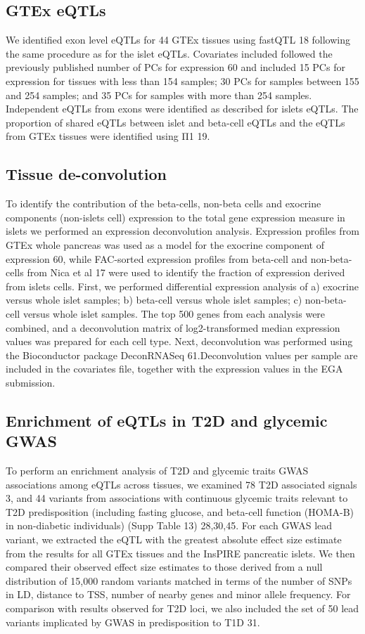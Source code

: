 \subsection{GTEx eQTLs}
We identified exon level eQTLs for 44 GTEx tissues using fastQTL 18 following the same procedure as for the islet eQTLs. Covariates included followed the previously published number of PCs for expression 60 and included 15 PCs for expression for tissues with less than 154 samples; 30 PCs for samples between 155 and 254 samples; and 35 PCs for samples with more than 254 samples. Independent eQTLs from exons were identified as described for islets eQTLs. The proportion of shared eQTLs between islet and beta-cell eQTLs and the eQTLs from GTEx tissues were identified using Π1 19.

\subsection{Tissue de-convolution}
To identify the contribution of the beta-cells, non-beta cells and exocrine components (non-islets cell) expression to the total gene expression measure in islets we performed an expression deconvolution analysis. Expression profiles from GTEx whole pancreas was used as a model for the exocrine component of expression 60, while FAC-sorted expression profiles from beta-cell and non-beta-cells from Nica et al 17 were used to identify the fraction of expression derived from islets cells. First, we performed differential expression analysis of a) exocrine versus whole islet samples; b) beta-cell versus whole islet samples; c) non-beta-cell versus whole islet samples. The top 500 genes from each analysis were combined, and a deconvolution matrix of log2-transformed median expression values was prepared for each cell type. Next, deconvolution was performed using the Bioconductor package DeconRNASeq 61.Deconvolution values per sample are included in the covariates file, together with the expression values in the EGA submission. 

\subsection{Enrichment of eQTLs in T2D and glycemic GWAS}
To perform an enrichment analysis of T2D and glycemic traits GWAS associations among eQTLs across tissues, we examined 78 T2D associated signals 3, and 44 variants from associations with continuous glycemic traits relevant to T2D predisposition (including fasting glucose, and beta-cell function (HOMA-B) in non-diabetic individuals) (Supp Table 13) 28,30,45. For each GWAS lead variant, we extracted the eQTL with the greatest absolute effect size estimate from the results for all GTEx tissues and the InsPIRE pancreatic islets. We then compared their observed effect size estimates to those derived from a null distribution of 15,000 random variants matched in terms of the number of SNPs in LD, distance to TSS, number of nearby genes and minor allele frequency. For comparison with results observed for T2D loci, we also included the set of 50 lead variants implicated by GWAS in predisposition to T1D 31.

